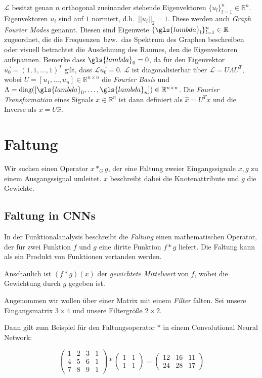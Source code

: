 $\mathcal{L}$ besitzt genau $n$ orthogonal zueinander stehende Eigenvektoren $\lbrace u_l \rbrace_{l=1}^n \in \mathbb{R}^n$.
Eigenvektoren $u_i$ sind auf $1$ normiert, d.h.\ $||u_i||_2 = 1$.
Diese werden auch \emph{Graph Fourier Modes} genannt.
Diesen sind Eigenwete $\lbrace \gls{lambda}_l \rbrace_{l=1}^n \in \mathbb{R}$ zugeordnet, die die \glqq{}Frequenzen\grqq\ bzw.\ das Spektrum des Graphen beschreiben oder visuell betrachtet die Ausdehnung des Raumes, den die Eigenvektoren aufspannen.
Bemerke dass $\gls{lambda}_0 = 0$, da für den Eigenvektor $\vec{u_0} = {(1, 1, \ldots, 1)}^T$ gilt, dass $\mathcal{L}\vec{u_0} = 0$.
$\mathcal{L}$ ist diagonalisierbar über $\mathcal{L} = U \Lambda U^T$, wobei $U = [u_1, \ldots, u_n] \in \mathbb{R}^{n \times n}$ die \emph{Fourier Basis} und $\Lambda = \text{diag}([\gls{lambda}_0, \ldots, \gls{lambda}_n]) \in \mathbb{R}^{n \times n}$.
Die \emph{Fourier Transformation} eines Signals $x \in \mathbb{R}^n$ ist dann definiert als $\hat{x} = U^{T}x$ und die Inverse als $x = U\hat{x}$.

\section{Faltung}

Wir suchen einen Operator $x *_G g$, der eine Faltung zweier Eingangssignale $x, g$ zu einem Ausgangssignal umleitet.
$x$ beschreibt dabei die Knotenattribute und $g$ die Gewichte.

\subsection{Faltung in CNNs}

In der Funktionalanalysis beschreibt die \emph{Faltung} einen mathematischen Operator, der für zwei Funktion $f$ und $g$ eine dirtte Funktion $f * g$ liefert.
Die Faltung kann als ein Produkt von Funktionen vertanden werden.

Anschaulich ist $(f * g)(x)$ der \emph{gewichtete Mittelwert} von $f$, wobei die Gewichtung durch $g$ gegeben ist.

Angenommen wir wollen über einer Matrix mit einem \emph{Filter} falten.
Sei unsere Eingangsmatrix $3 \times 4$ und unsere Filtergröße $2 \times 2$.

Dann gilt zum Beispiel für den Faltungsoperator $*$ in einem Convolutional Neural Network:

\begin{equation}
  \begin{pmatrix}
    1 & 2 & 3 & 1\\
    4 & 5 & 6 & 1\\
    7 & 8 & 9 & 1
  \end{pmatrix} * \begin{pmatrix}
    1 & 1\\
    1 & 1
  \end{pmatrix} = \begin{pmatrix}
    12 & 16 & 11\\
    24 & 28 & 17
  \end{pmatrix}
\end{equation}

